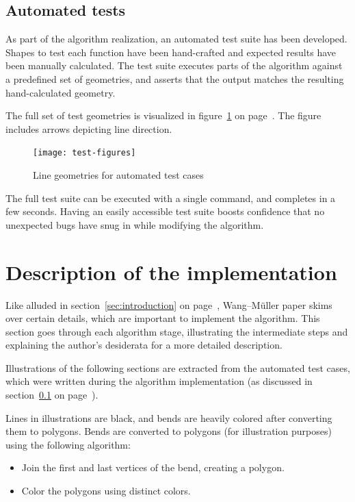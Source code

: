 \documentclass[a4paper]{article}
\newcommand{\onpage}[1]{\ref{#1} on page~\pageref{#1}}
\newcommand{\WM}{Wang--M{\"u}ller}
\begin{document}
\subsection{Automated tests}
\label{sec:automated-tests}

As part of the algorithm realization, an automated test suite has been
developed. Shapes to test each function have been hand-crafted and expected
results have been manually calculated. The test suite executes parts of the
algorithm against a predefined set of geometries, and asserts that the output
matches the resulting hand-calculated geometry.

The full set of test geometries is visualized in
figure~\onpage{fig:test-figures}. The figure includes arrows depicting line
direction.

\begin{figure}[h]
    \centering
    \texttt{[image: test-figures]}
    \caption{Line geometries for automated test cases}
    \label{fig:test-figures}
\end{figure}

The full test suite can be executed with a single command, and completes in a
few seconds. Having an easily accessible test suite boosts confidence that no
unexpected bugs have snug in while modifying the algorithm.

\section{Description of the implementation}

Like alluded in section~\onpage{sec:introduction}, {\WM} paper skims over
certain details, which are important to implement the algorithm. This section
goes through each algorithm stage, illustrating the intermediate steps and
explaining the author's desiderata for a more detailed description.

Illustrations of the following sections are extracted from the automated test
cases, which were written during the algorithm implementation (as discussed in
section~\onpage{sec:automated-tests}).

Lines in illustrations are black, and bends are heavily colored after
converting them to polygons. Bends are converted to polygons (for illustration
purposes) using the following algorithm:

\begin{itemize}
    \item Join the first and last vertices of the bend, creating a polygon.
    \item Color the polygons using distinct colors.
\end{itemize}
\end{document}
